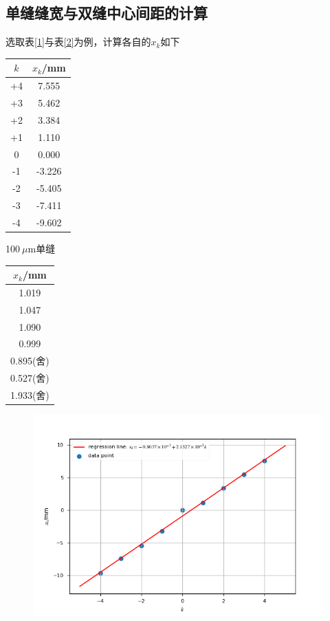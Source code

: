 \documentclass[a4paper]{article}%
\begin{document}
\subsection{单缝缝宽与双缝中心间距的计算}
选取表\ref{1}与表\ref{2}为例，计算各自的$x_k$如下
\begin{table}[H]
    \begin{minipage}{0.25\linewidth}
        \centering
        \begin{tabular}{cc}
            \toprule
            $k$ &$x_k$/mm\\
            \midrule
            +4&7.555\\
            +3&5.462\\
            +2&3.384\\
            +1&1.110\\
            0&0.000\\
            -1&-3.226\\
            -2&-5.405\\
            -3&-7.411\\
            -4&-9.602\\
            \bottomrule
        \end{tabular}
        \caption{100$~\mu$m单缝}\label{3}
    \end{minipage}
    \begin{minipage}{0.25\linewidth}
        \centering
        \begin{tabular}{c}
            \toprule
            $x_k$/mm\\
            \midrule
            1.019\\
            1.047\\
            1.090\\
            0.999\\
            0.895(舍)\\
            0.527(舍)\\
            1.933(舍)\\
            \bottomrule
        \end{tabular}
        \caption{190$~\mu$m双缝}\label{4}
    \end{minipage}
    \begin{minipage}{0.5\linewidth}
        \centering
        \begin{figure}[H]
            \includegraphics[scale=0.5]{Figure.png}

\end{figure}
\end{minipage}
\end{table}
\end{document}
